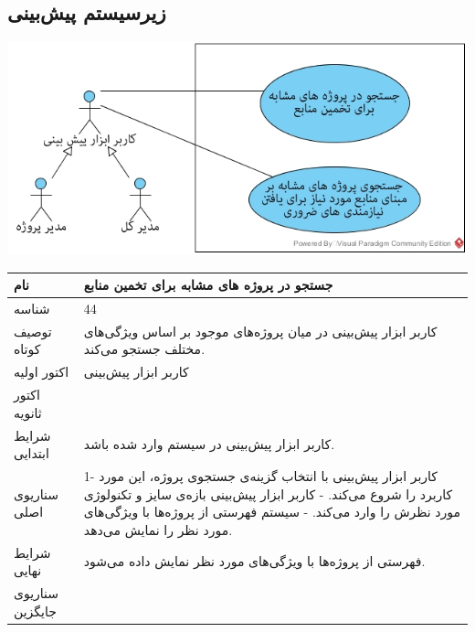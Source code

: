 \newpage
\subsection{زیرسیستم پیش‌بینی}

\vspace{2cm}
\begin{center}
\includegraphics[width=\textwidth]{Diagrams/Anticipating.jpg}
\end{center}


\newpage
\begin{tabular}{|p{2cm}|p{10cm}|}
\hline
نام
&
جستجو در پروژه های مشابه برای تخمین منابع
\\
\hline
شناسه
&
44
\\
\hline
توصیف کوتاه
&
کاربر ابزار پیش‌بینی در میان پروژه‌های موجود بر اساس ویژگی‌های مختلف جستجو می‌کند.
\\
\hline
اکتور اولیه
&
کاربر ابزار پیش‌بینی
\\
\hline
اکتور ثانویه
&

\\
\hline
شرایط ابتدایی
&
کاربر ابزار پیش‌بینی در سیستم وارد شده باشد.
\\
\hline
سناریوی اصلی
&
1- کاربر ابزار پیش‌بینی با انتخاب گزینه‌ی جستجوی پروژه، این مورد کاربرد را شروع می‌کند.
\newline
2- کاربر ابزار پیش‌بینی بازه‌ی سایز و تکنولوژی مورد نظرش را وارد می‌کند.
\newline
3- سیستم فهرستی از پروژه‌ها با ویژگی‌های مورد نظر را نمایش می‌دهد.
\\
\hline
شرایط نهایی
&
فهرستی از پروژه‌ها با ویژگی‌های مورد نظر نمایش داده می‌شود.
\\
\hline
سناریوی جایگزین
&

\\
\hline
\end{tabular}

\vspace{2cm}

